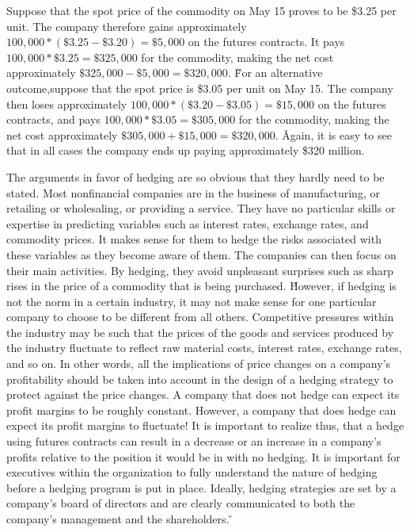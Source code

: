 Suppose that the spot price of the commodity on May 15 proves to be \$3.25 per unit. The company therefore gains
approximately $100,000 * (\$3.25 - \$3.20) = \$5,000$ on the futures contracts. It pays $100,000 * \$3.25 = \$325,000$
for the commodity, making the net cost approximately $\$325,000 - \$5,000 = \$320,000$. \v

For an alternative outcome,suppose that the spot price is \$3.05 per unit on May 15. The company then loses
approximately $100,000 * (\$3.20 - \$3.05) = \$15,000$ on the futures contracts, and pays $100,000 * \$3.05 = \$305,000$
for the commodity, making the net cost approximately $\$305,000 + \$15,000 = \$320,000$. \v

Again, it is easy to see that in all cases the company ends up paying approximately \$320 million.
\ee

The arguments in favor of hedging are so obvious that they hardly need to be stated. Most nonfinancial companies are
in the business of manufacturing, or retailing or wholesaling, or providing a service. They have no particular
skills or expertise in predicting variables such as interest rates, exchange rates, and commodity prices. It makes
sense for them to hedge the risks associated with these variables as they become aware of them. The companies can
then focus on their main activities. By hedging, they avoid unpleasant surprises such as sharp rises in the price of
a commodity that is being purchased. \v

However, if hedging is not the norm in a certain industry, it may not make sense for one particular company to
choose to be different from all others. Competitive pressures within the industry may be such that the prices of the
goods and services produced by the industry fluctuate to reflect raw material costs, interest rates, exchange rates,
and so on. In other words, all the implications of price changes on a company’s profitability should be taken into
account in the design of a hedging strategy to protect against the price changes. A company that does not hedge can
expect its profit margins to be roughly constant. However, a company that does hedge can expect its profit margins
to fluctuate! It is important to realize thus, that a hedge using futures contracts can result in a decrease or an
increase in a company’s profits relative to the position it would be in with no hedging. It is important for
executives within the organization to fully understand the nature of hedging before a hedging program is put in
place. Ideally, hedging strategies are set by a company’s board of directors and are clearly communicated to both
the company’s management and the shareholders. \v

